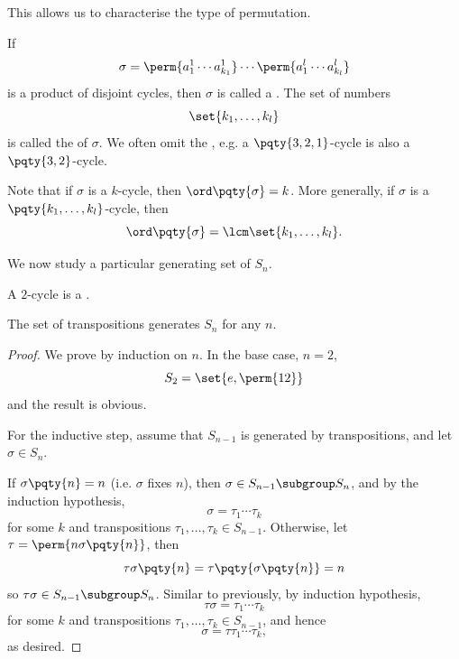 This allows us to characterise the type of permutation.

\begin{definition}
    \label{def:cycle-type}%
    If
    \[
        \sigma = \perm{{a_1^1} \cdots {a_{k_1}^1}} \cdots \perm{{a_1^l} \cdots {a_{k_l}^l}}
    \]
    is a product of disjoint cycles, then \(\sigma\) is called a . The set of numbers
    \[
        \set{k_1, \ldots, k_l}
    \]
    is called the  of \(\sigma\). We often omit the , e.g. a \(\pqty{3, 2, 1}\)-cycle is also a \(\pqty{3, 2}\)-cycle.
\end{definition}

\begin{remark}
    Note that if \(\sigma\) is a \(k\)-cycle, then \(\ord\pqty{\sigma} = k\). More generally, if \(\sigma\) is a \(\pqty{k_1, \ldots, k_l}\)-cycle, then
    \[
        \ord \pqty{\sigma} = \lcm \set{k_1, \ldots, k_l}.
    \]
\end{remark}

We now study a particular generating set of \(S_n\).

\begin{definition}[Transposition]
    \label{def:transposition}%
    A \(2\)-cycle is a .
\end{definition}

\begin{theorem}
    \label{thm:transposition-generate}%
    The set of transpositions generates \(S_n\) for any \(n\).
\end{theorem}

\begin{proof}
    We prove by induction on \(n\). In the base case, \(n = 2\),
    \[
        S_2 = \set{e, \perm{12}}
    \]
    and the result is obvious.

    For the inductive step, assume that \(S_{n - 1}\) is generated by transpositions, and let \(\sigma \in S_n\).

    If \(\sigma\pqty{n} = n\) (i.e. \(\sigma\) fixes \(n\)), then \(\sigma \in S_{n - 1} \subgroup S_n\), and by the induction hypothesis,
    \[
        \sigma = \tau_1 \cdots \tau_k
    \]
    for some \(k\) and transpositions \(\tau_1, \ldots, \tau_k \in S_{n - 1}\). Otherwise, let \(\tau = \perm{n {\sigma\pqty{n}}}\), then
    \[
        \tau \sigma \pqty{n} = \tau\pqty{\sigma\pqty{n}} = n
    \]
    so \(\tau \sigma \in S_{n - 1} \subgroup S_n\). Similar to previously, by induction hypothesis,
    \[
        \tau \sigma = \tau_1 \cdots \tau_k
    \]
    for some \(k\) and transpositions \(\tau_1, \ldots, \tau_k \in S_{n - 1}\), and hence
    \[
        \sigma = \tau \tau_1 \cdots \tau_k,
    \]
    as desired.
\end{proof}

